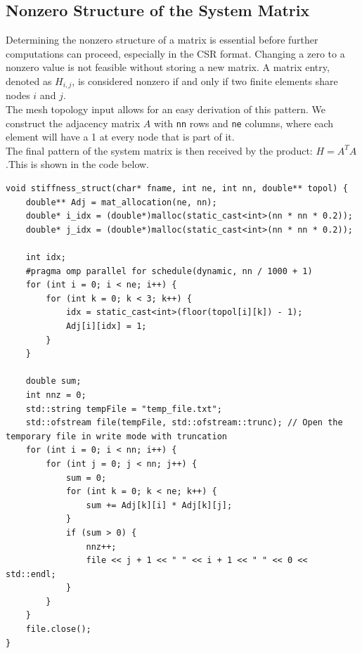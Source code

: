 \documentclass{article}
\begin{document}
\subsection{Nonzero Structure of the System Matrix}
Determining the nonzero structure of a matrix is essential before further computations can proceed, especially in the CSR format. Changing a zero to a nonzero value is not feasible without storing a new matrix. A matrix entry, denoted as $H_{i,j}$, is considered nonzero if and only if two finite elements share nodes $i$ and $j$.\\
The mesh topology input allows for an easy derivation of this pattern. We construct the adjacency matrix $A$ with \texttt{nn} rows and \texttt{ne} columns, where each element will have a 1 at every node that is part of it. \\ 
The final pattern of the system matrix is then received by the product: $H = A^TA$.This is shown in the code below. \\
\begin{verbatim}
void stiffness_struct(char* fname, int ne, int nn, double** topol) {
    double** Adj = mat_allocation(ne, nn);
    double* i_idx = (double*)malloc(static_cast<int>(nn * nn * 0.2));
    double* j_idx = (double*)malloc(static_cast<int>(nn * nn * 0.2));

    int idx;
    #pragma omp parallel for schedule(dynamic, nn / 1000 + 1)
    for (int i = 0; i < ne; i++) {
        for (int k = 0; k < 3; k++) {
            idx = static_cast<int>(floor(topol[i][k]) - 1);
            Adj[i][idx] = 1;
        }
    }

    double sum;
    int nnz = 0;
    std::string tempFile = "temp_file.txt";
    std::ofstream file(tempFile, std::ofstream::trunc); // Open the temporary file in write mode with truncation
    for (int i = 0; i < nn; i++) {
        for (int j = 0; j < nn; j++) {
            sum = 0;
            for (int k = 0; k < ne; k++) {
                sum += Adj[k][i] * Adj[k][j];
            }
            if (sum > 0) {
                nnz++;
                file << j + 1 << " " << i + 1 << " " << 0 << std::endl;
            }
        }
    }
    file.close();
}


\end{verbatim}
\end{document}
